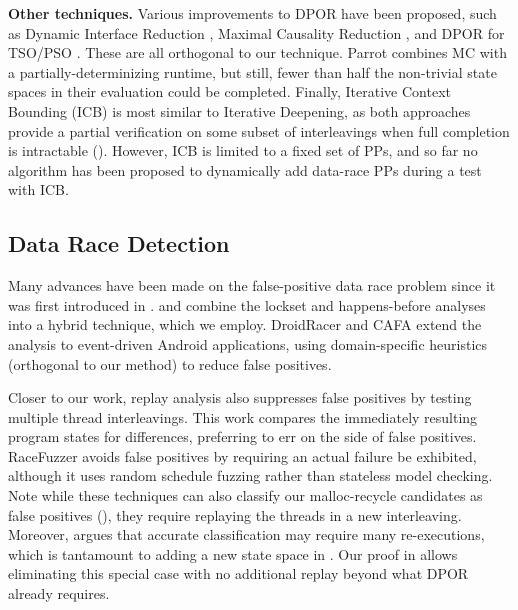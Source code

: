 {\bf Other techniques.} Various improvements to DPOR have been proposed, such as Dynamic Interface Reduction \cite{demeter}, Maximal Causality Reduction \cite{mcr}, and DPOR for TSO/PSO \cite{tsopso}.
These are all orthogonal to our technique.
Parrot \cite{parrot} combines MC with a partially-determinizing runtime, but still, fewer than half the non-trivial state spaces in their evaluation could be completed.
Finally, Iterative Context Bounding (ICB) \cite{chess-icb} is most similar to Iterative Deepening,
as both approaches provide a partial verification on some subset of interleavings when full completion is intractable (\sect{\ref{sec:future}}).
However, ICB is limited to a fixed set of PPs, and so far no algorithm has been proposed to dynamically add data-race PPs during a test with ICB.

\subsection{Data Race Detection}
\label{sec:related-dr}

Many advances have been made on the false-positive data race problem since it was first introduced in \cite{eraser}.
\cite{hybriddatarace} and \cite{tsan} combine the lockset and happens-before analyses into a hybrid technique, which we employ.
DroidRacer \cite{droidracer} and CAFA \cite{cafa} extend the analysis to event-driven Android applications, using domain-specific heuristics (orthogonal to our method) to reduce false positives. %

Closer to our work, replay analysis \cite{recordreplaydrs} also suppresses false positives by testing multiple thread interleavings.
This work compares the immediately resulting program states for differences,
preferring to err on the side of false positives.
RaceFuzzer \cite{racefuzzer} avoids false positives by requiring an actual failure be exhibited,
although it uses random schedule fuzzing rather than stateless model checking.
Note while these techniques can also classify our malloc-recycle candidates as false positives (\sect{\ref{sec:recycle}}),
they require replaying the threads in a new interleaving.
Moreover, \cite{portend} argues that accurate classification may require many re-executions,
which is tantamount to adding a new state space in \quicksand.
Our proof in \sect{\ref{sec:recycle}} allows eliminating this special case with no additional replay beyond what DPOR already requires.

